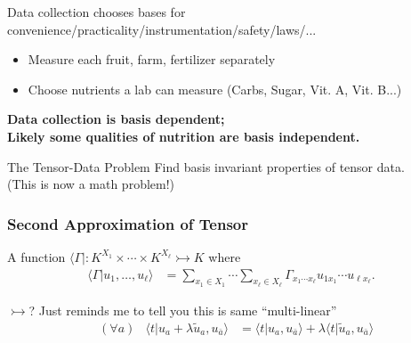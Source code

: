 \documentclass{beamer}
\newcommand{\bmto}{\rightarrowtail}
\begin{document}
\begin{frame} 
    Data collection chooses bases for convenience/practicality/instrumentation/safety/laws/...
    \begin{itemize}
        \item Measure each fruit, farm, fertilizer  separately
        \item Choose nutrients a lab can measure (Carbs, Sugar, Vit. A, Vit. B...)
    \end{itemize}

    \bigskip
    \textbf{Data collection is basis dependent;\\ 
    Likely some qualities of nutrition are basis independent.}

    \begin{block}{The Tensor-Data Problem}
        Find basis invariant properties of tensor data.\\
        (This is now a math problem!)
    \end{block}
    
\end{frame}


\begin{frame}

    \frametitle{Second Approximation of Tensor}

    A function $\langle \Gamma |:K^{X_1}\times \cdots \times K^{X_{\ell}}\bmto K$ where 
    \begin{align*}
        \langle \Gamma| u_1,\ldots, u_{\ell}\rangle 
        & = \sum_{x_1\in X_1} \cdots \sum_{x_{\ell}\in X_{\ell}} \Gamma_{x_1\cdots x_{\ell}} u_{1x_1}\cdots u_{\ell x_{\ell}}.
    \end{align*}

    {\color{magenta} $\bmto$?}  Just reminds me to tell you this is same ``multi-linear''
    \begin{align*}
        & (\forall a) & 
        \langle t|u_a+\lambda \tilde{u}_{a},u_{\bar{a}}\rangle 
        & = \langle t|u_a,u_{\bar{a}}\rangle 
        + \lambda \langle t|\tilde{u}_{a},u_{\bar{a}}\rangle 
    \end{align*}
    
\end{frame}
\end{document}
